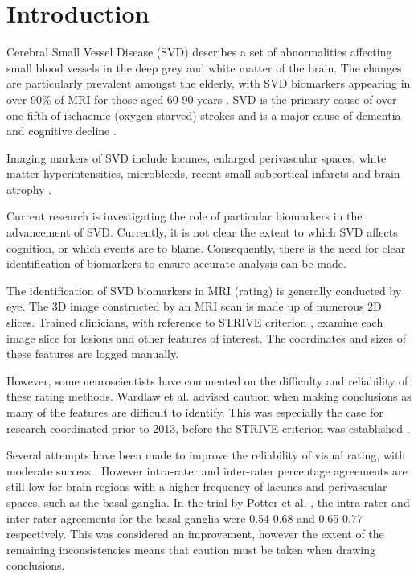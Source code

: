%
%

\chapter{Introduction}\label{s-intro}

{\noindent} Cerebral Small Vessel Disease (SVD) describes a set of abnormalities affecting small blood vessels in the deep grey and white matter of the brain. The changes are particularly prevalent amongst the elderly, with SVD biomarkers appearing in over 90\% of MRI for those aged 60-90 years \cite{deLeeuwF-E2001Pocw}. SVD is the primary cause of over one fifth of ischaemic (oxygen-starved) strokes \cite{SmithStephen2002ARaA} and is a major cause of dementia and cognitive decline \cite{NorrvingBo2008Linb}.

Imaging markers of SVD include lacunes, enlarged perivascular spaces, white matter hyperintensities, microbleeds, recent small subcortical infarcts and brain atrophy \cite{WardlawJ.M.2013Nsfr}.

Current research is investigating the role of particular biomarkers in the advancement of SVD. Currently, it is not clear the extent to which SVD affects cognition, or which events are to blame. Consequently, there is the need for clear identification of biomarkers to ensure accurate analysis can be made.

The identification of SVD biomarkers in MRI (rating) is generally conducted by eye. The 3D image constructed by an MRI scan is made up of numerous 2D slices. Trained clinicians, with reference to STRIVE criterion \cite{WardlawJ.M.2013Nsfr}, examine each image slice for lesions and other features of interest. The coordinates and sizes of these features are logged manually.

However, some neuroscientists have commented on the difficulty and reliability of these rating methods. Wardlaw et al. \cite{WardlawJm2013Mosc} advised caution when making conclusions as many of the features are difficult to identify. This was especially the case for research coordinated prior to 2013, before the STRIVE criterion was established \cite{WardlawJ.M.2013Nsfr}.

Several attempts have been made to improve the reliability of visual rating, with moderate success \cite{AdamsH.H.Hieab2013RMfD, PotterGillian2015CPSV}. However intra-rater and inter-rater percentage agreements are still low for brain regions with a higher frequency of lacunes and perivascular spaces, such as the basal ganglia. In the trial by Potter et al. \cite{PotterGillian2015CPSV},  the intra-rater and inter-rater agreements for the basal ganglia were 0.54-0.68 and 0.65-0.77 respectively. This was considered an improvement, however the extent of the remaining inconsistencies means that caution must be taken when drawing conclusions.

